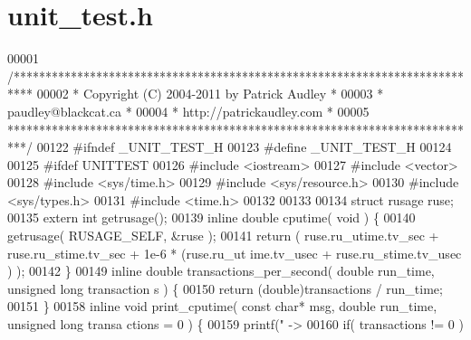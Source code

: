 \section{unit\_\-test.h}

\begin{DoxyCode}
00001 \textcolor{comment}{/***************************************************************************}
00002 \textcolor{comment}{ *   Copyright (C) 2004-2011 by Patrick Audley                             *}
00003 \textcolor{comment}{ *   paudley@blackcat.ca                                                   *}
00004 \textcolor{comment}{ *   http://patrickaudley.com                                              *}
00005 \textcolor{comment}{ ***************************************************************************/}
00122 \textcolor{preprocessor}{#ifndef \_UNIT\_TEST\_H}
00123 \textcolor{preprocessor}{}\textcolor{preprocessor}{#define \_UNIT\_TEST\_H}
00124 \textcolor{preprocessor}{}
00125 \textcolor{preprocessor}{#ifdef UNITTEST}
00126 \textcolor{preprocessor}{}\textcolor{preprocessor}{#include <iostream>}
00127 \textcolor{preprocessor}{#include <vector>}
00128 \textcolor{preprocessor}{#include <sys/time.h>}
00129 \textcolor{preprocessor}{#include <sys/resource.h>}
00130 \textcolor{preprocessor}{#include <sys/types.h>}
00131 \textcolor{preprocessor}{#include <time.h>}
00132 
00133 
00134 \textcolor{keyword}{struct }rusage ruse;
00135 \textcolor{keyword}{extern} \textcolor{keywordtype}{int} getrusage();
00139 \textcolor{keyword}{inline} \textcolor{keywordtype}{double} cputime( \textcolor{keywordtype}{void} ) \{
00140   getrusage( RUSAGE\_SELF, &ruse );
00141         \textcolor{keywordflow}{return} ( ruse.ru\_utime.tv\_sec + ruse.ru\_stime.tv\_sec + 1e-6 * (ruse.ru\_ut
      ime.tv\_usec + ruse.ru\_stime.tv\_usec ) );
00142 \}
00149 \textcolor{keyword}{inline} \textcolor{keywordtype}{double} transactions_per_second( \textcolor{keywordtype}{double} run\_time, \textcolor{keywordtype}{unsigned} \textcolor{keywordtype}{long} transaction
      s ) \{
00150         \textcolor{keywordflow}{return} (\textcolor{keywordtype}{double})transactions / run\_time;
00151 \}
00158 \textcolor{keyword}{inline} \textcolor{keywordtype}{void} print_cputime( \textcolor{keyword}{const} \textcolor{keywordtype}{char}* msg, \textcolor{keywordtype}{double} run\_time, \textcolor{keywordtype}{unsigned} \textcolor{keywordtype}{long} transa
      ctions = 0 ) \{
00159         printf(\textcolor{stringliteral}{"  -> %
00160         \textcolor{keywordflow}{if}( transactions != 0 )
}
\end{DoxyCode}
